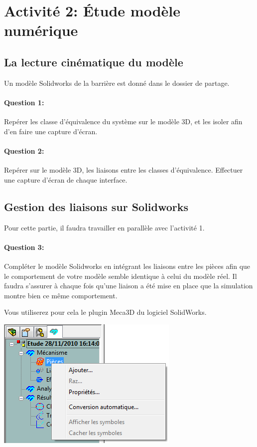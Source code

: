 \section{Activité 2: Étude modèle numérique}

\subsection{La lecture cinématique du modèle}

Un modèle Solidworks de la barrière est donné dans le dossier de partage.

\paragraph{Question 1:} Repérer les classe d'équivalence du système sur le modèle 3D, et les isoler afin d'en faire une capture d'écran.

\paragraph{Question 2:} Repérer sur le modèle 3D, les liaisons entre les classes d'équivalence. Effectuer une capture d'écran de chaque interface.

\subsection{Gestion des liaisons sur Solidworks}

Pour cette partie, il faudra travailler en parallèle avec l'activité 1.

\paragraph{Question 3:} Compléter le modèle Solidworks en intégrant les liaisons entre les pièces afin que le comportement de votre modèle semble identique à celui du modèle réel. Il faudra s'assurer à chaque fois qu'une liaison a été mise en place que la simulation montre bien ce même comportement.

\begin{minipage}{0.45\linewidth}
Vous utiliserez pour cela le plugin Meca3D du logiciel SolidWorks.
\end{minipage}
\hfill
\begin{minipage}{0.5\linewidth}
\includegraphics[width=0.8\linewidth]{img/meca3d}
\end{minipage}

